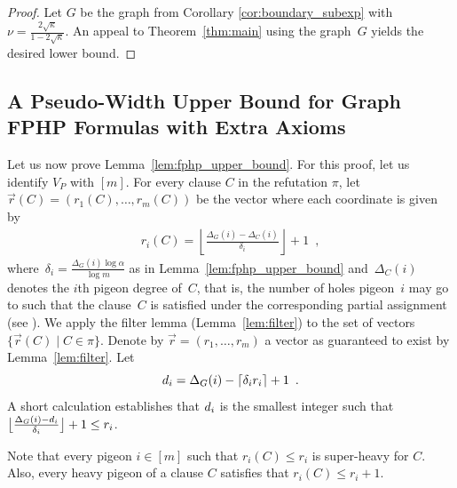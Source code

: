 \documentclass{article}
\newcommand{\ceiling}[1]{\lceil #1 \rceil}
\newcommand{\Floor}[1]{\bigl \lfloor #1 \bigr \rfloor}
\newcommand{\FLOOR}[1]{\left \lfloor #1 \right \rfloor}
\newcommand{\set}[1]{\{ #1 \}}
\newcommand{\eqperiod}{\enspace .}
\newcommand{\eqcomma}{\enspace ,}
\newcommand{\refth}[1]{Theorem~\ref{#1}}
\newcommand{\reflem}[1]{Lemma~\ref{#1}}
\newcommand{\refpi}{\pi}
\newcommand{\heavy}{heavy\xspace}
\newcommand{\sheavy}{super-heavy\xspace}
\renewcommand{\deg}[2][XXXXXXXXXXXX]{\Delta_{#1}(#2)}
\newcommand{\V}[1][]{V_{#1}}
\newcommand{\Vp}{\V[P]}
\newcommand{\thr}[1]{ \ensuremath d_{{#1}} }
\newcommand{\adv}[1]{\delta_{{#1}}}
\newcommand{\PSEUDOWIDTH}{Pseudo-Width\xspace}
\newcommand{\ri}[1]{r_{#1}}
\newcommand{\riof}[2]{r_{#2}(#1)}
\newcommand{\vecr}{\vec{r}}
\newcommand{\vecrof}[1]{\vec{r}(#1)}
\newcommand{\vecrdef}[1]{\vecr = \left(\ri{1}, \ldots, \ri{#1}\right)}
\newcommand{\vecrofdef}[2]{\vecrof{#1} = 
\left(\riof{#1}{1}, \ldots, \riof{#1}{#2}\right)}
\newcommand{\squeezesubsection}[1]{\subsection{#1}}
\numberwithin{equation}{section}
\begin{document}
\begin{proof}
  Let $G$ be the graph from Corollary \ref{cor:boundary_subexp} with
  $\nu = \frac{ 2\sqrt{\kappa} }{ 1 - 2\sqrt{\kappa} }$.
  An appeal to \refth{thm:main} using the graph~$G$ yields 
  the desired lower bound.
\end{proof}






 
\squeezesubsection{A \PSEUDOWIDTH Upper Bound for Graph FPHP Formulas
  with Extra Axioms}
\label{sec:fphp_upper_bound}

Let us now prove \reflem{lem:fphp_upper_bound}.  For this proof, let
us identify $\Vp$ with $[m]$.  For every clause $C$ in the refutation
$\refpi$, let $\vecrofdef{C}{m}$ be the vector where each coordinate
is given by
\begin{align}
  \riof{C}{i} = \FLOOR{\frac{\deg[G]{i} - \deg[C]{i}}{\adv{i}}} + 1 \eqcomma
\end{align}
where~$\adv{i} = \frac{\deg[G]{i} \log \alpha}{\log m}$ as in
\reflem{lem:fphp_upper_bound} and~$\deg[C]{i}$ denotes the $i$th
pigeon degree of~$C$, that is, the number of holes pigeon~$i$ may go
to such that the clause~$C$ is satisfied under the corresponding
partial assignment (see ). We apply the filter lemma
(\reflem{lem:filter}) to the set of vectors
$\set{\vecrof{C} \mid C \in \refpi}$.  Denote by $\vecrdef{m}$ a
vector as guaranteed to exist by \reflem{lem:filter}.  Let
\begin{equation}
  \label{eq:def-d-i}
  \thr{i} = \deg[G]{i} - \ceiling{\adv{i} \ri{i}} + 1 \eqperiod
\end{equation}
A short calculation establishes that $\thr{i}$ is the smallest integer such that 
$\Floor{\frac{\deg[G]{i} - \thr{i}}{\adv{i}}} + 1 \le \ri{i}$.



Note that every pigeon $i \in [m]$
such that $\riof{C}{i} \le \ri{i}$
is 
\sheavy
for $C$. Also, every 
\heavy pigeon of a clause $C$
satisfies that $\riof{C}{i} \le \ri{i} + 1$. 
\end{document}
